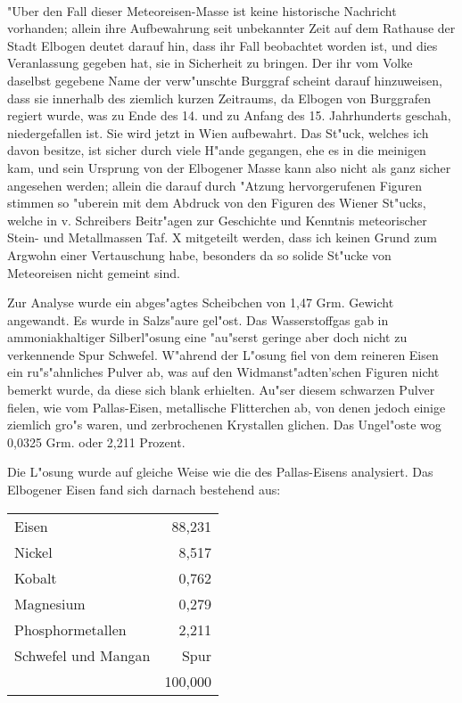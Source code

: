 \documentclass[a4paper, 11pt, oneside]{article}
\begin{document}
\paragraph{}
"Uber den Fall dieser Meteoreisen-Masse ist keine historische Nachricht vorhanden; allein ihre Aufbewahrung seit unbekannter Zeit auf dem Rathause der Stadt Elbogen deutet darauf hin, dass ihr Fall beobachtet worden ist, und dies Veranlassung gegeben hat, sie in Sicherheit zu bringen. Der ihr vom Volke daselbst gegebene Name der verw"unschte Burggraf scheint darauf hinzuweisen, dass sie innerhalb des ziemlich kurzen Zeitraums, da Elbogen von Burggrafen regiert wurde, was zu Ende des 14. und zu Anfang des 15. Jahrhunderts geschah, niedergefallen ist. Sie wird jetzt in Wien aufbewahrt. Das St"uck, welches ich davon besitze, ist sicher durch viele H"ande gegangen, ehe es in die meinigen kam, und sein Ursprung von der Elbogener Masse kann also nicht als ganz sicher angesehen werden; allein die darauf durch "Atzung hervorgerufenen Figuren stimmen so "uberein mit dem Abdruck von den Figuren des Wiener St"ucks, welche in v. Schreibers Beitr"agen zur Geschichte und Kenntnis meteorischer Stein- und Metallmassen Taf. X mitgeteilt werden, dass ich keinen Grund zum Argwohn einer Vertauschung habe, besonders da so solide St"ucke von Meteoreisen nicht gemeint sind.

Zur Analyse wurde ein abges"agtes Scheibchen von 1,47 Grm. Gewicht angewandt. Es wurde in Salzs"aure gel"ost. Das Wasserstoffgas gab in ammoniakhaltiger Silberl"osung eine "au"serst geringe aber doch nicht zu verkennende Spur Schwefel. W"ahrend der L"osung fiel von dem reineren Eisen ein ru"s"ahnliches Pulver ab, was auf den Widmanst"adten’schen Figuren nicht bemerkt wurde, da diese sich blank erhielten. Au"ser diesem schwarzen Pulver fielen, wie vom Pallas-Eisen, metallische Flitterchen ab, von denen jedoch einige ziemlich gro"s waren, und zerbrochenen Krystallen glichen. Das Ungel"oste wog 0,0325 Grm. oder 2,211 Prozent.

Die L"osung wurde auf gleiche Weise wie die des Pallas-Eisens analysiert. Das Elbogener Eisen fand sich darnach bestehend aus:
\begin{center}
\begin{tabular}{ l r }
    Eisen & 88,231\\
    Nickel & 8,517\\
    Kobalt & 0,762\\
    Magnesium & 0,279\\
    Phosphormetallen & 2,211\\
    Schwefel und Mangan & Spur\\
     & 100,000\\
\end{tabular}
\end{center}
\end{document}
